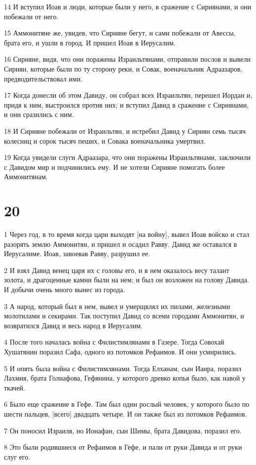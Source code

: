 \par 14 И вступил Иоав и люди, которые были у него, в сражение с Сириянами, и они побежали от него.
\par 15 Аммонитяне же, увидев, что Сирияне бегут, и сами побежали от Авессы, брата его, и ушли в город. И пришел Иоав в Иерусалим.
\par 16 Сирияне, видя, что они поражены Израильтянами, отправили послов и вывели Сириян, которые были по ту сторону реки, и Совак, военачальник Адраазаров, предводительствовал ими.
\par 17 Когда донесли об этом Давиду, он собрал всех Израильтян, перешел Иордан и, придя к ним, выстроился против них; и вступил Давид в сражение с Сириянами, и они сразились с ним.
\par 18 И Сирияне побежали от Израильтян, и истребил Давид у Сириян семь тысяч колесниц и сорок тысяч пеших, и Совака военачальника умертвил.
\par 19 Когда увидели слуги Адраазара, что они поражены Израильтянами, заключили с Давидом мир и подчинились ему. И не хотели Сирияне помогать более Аммонитянам.

\chapter{20}

\par 1 Через год, в то время когда цари выходят [на войну], вывел Иоав войско и стал разорять землю Аммонитян, и пришел и осадил Равву. Давид же оставался в Иерусалиме. Иоав, завоевав Равву, разрушил ее.
\par 2 И взял Давид венец царя их с головы его, и в нем оказалось весу талант золота, и драгоценные камни были на нем; и был он возложен на голову Давида. И добычи очень много вынес из города.
\par 3 А народ, который был в нем, вывел и умерщвлял их пилами, железными молотилами и секирами. Так поступил Давид со всеми городами Аммонитян, и возвратился Давид и весь народ в Иерусалим.
\par 4 После того началась война с Филистимлянами в Газере. Тогда Совохай Хушатянин поразил Сафа, одного из потомков Рефаимов. И они усмирились.
\par 5 И опять была война с Филистимлянами. Тогда Елханам, сын Иаира, поразил Лахмия, брата Голиафова, Гефянина, у которого древко копья было, как навой у ткачей.
\par 6 Было еще сражение в Гефе. Там был один рослый человек, у которого было по шести пальцев, [всего] двадцать четыре. И он также был из потомков Рефаимов.
\par 7 Он поносил Израиля, но Ионафан, сын Шимы, брата Давидова, поразил его.
\par 8 Это были родившиеся от Рефаимов в Гефе, и пали от руки Давида и от руки слуг его.

